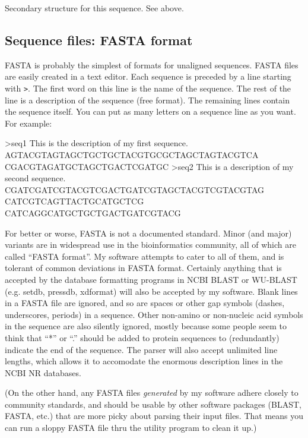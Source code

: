 \begin{sreitems}{}
\item [\emprog{SS}]
	Secondary structure for this sequence. See  above. 
\end{sreitems}

\subsection{Sequence files: FASTA format}

FASTA is probably the simplest of formats for unaligned sequences.
FASTA files are easily created in a text editor.  Each sequence is
preceded by a line starting with \verb+>+. The first word on this line
is the name of the sequence. The rest of the line is a description of
the sequence (free format). The remaining lines contain the sequence
itself. You can put as many letters on a sequence line as you want.
For example:

\begin{sreoutput}
>seq1 This is the description of my first sequence.
AGTACGTAGTAGCTGCTGCTACGTGCGCTAGCTAGTACGTCA CGACGTAGATGCTAGCTGACTCGATGC
>seq2 This is a description of my second sequence.
CGATCGATCGTACGTCGACTGATCGTAGCTACGTCGTACGTAG CATCGTCAGTTACTGCATGCTCG
CATCAGGCATGCTGCTGACTGATCGTACG
\end{sreoutput}

For better or worse, FASTA is not a documented standard. Minor (and
major) variants are in widespread use in the bioinformatics community,
all of which are called ``FASTA format''. My software attempts to
cater to all of them, and is tolerant of common deviations in FASTA
format. Certainly anything that is accepted by the database formatting
programs in NCBI BLAST or WU-BLAST (e.g. setdb, pressdb, xdformat)
will also be accepted by my software. Blank lines in a FASTA file are
ignored, and so are spaces or other gap symbols (dashes, underscores,
periods) in a sequence. Other non-amino or non-nucleic acid symbols in
the sequence are also silently ignored, mostly because some people
seem to think that ``*'' or ``.'' should be added to protein sequences
to (redundantly) indicate the end of the sequence. The parser will
also accept unlimited line lengths, which allows it to accomodate the
enormous description lines in the NCBI NR databases.

(On the other hand, any FASTA files \emph{generated} by my software
adhere closely to community standards, and should be usable by other
software packages (BLAST, FASTA, etc.) that are more picky about
parsing their input files. That means you can run a sloppy FASTA file
thru the  utility program to clean it up.)


